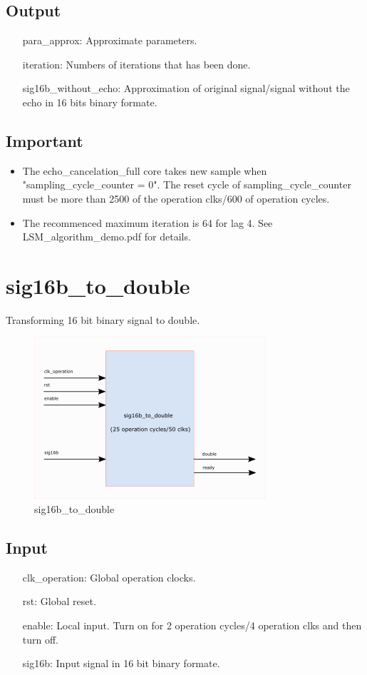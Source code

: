 \documentclass[twoside,a4paper]{refart}
\begin{document}
\subsection{Output}
\begin{itemize}
	\item[para\_approx:] Approximate parameters.
	\item[iteration:] Numbers of iterations that has been done.
	\item[sig16b\_without\_echo:] Approximation of original signal/signal without the echo in 16 bits binary formate.
\end{itemize}
\subsection{Important}
\begin{itemize}
	\item The echo\_cancelation\_full core takes new sample when "sampling\_cycle\_counter = 0". The reset cycle of sampling\_cycle\_counter must be more than 2500 of the operation clks/600 of operation cycles.
	\item The recommenced maximum iteration is 64 for lag 4. See LSM\_algorithm\_demo.pdf for details.
\end{itemize}
\section{sig16b\_to\_double}
Transforming 16 bit binary signal to double.
\begin{figure}[H]
	\centering
	\includegraphics[scale=1.2]{sig16b_to_double.png}
	\caption{sig16b\_to\_double}
	\label{}
\end{figure}
\subsection{Input}
\begin{itemize}
	\item[clk\_operation:] Global operation clocks.
	\item[rst:   ] Global reset.
	\item[enable:] Local input. Turn on for 2 operation cycles/4 operation clks and then turn off.
	\item[sig16b:] Input signal in 16 bit binary formate.
\end{itemize}
\end{document}
